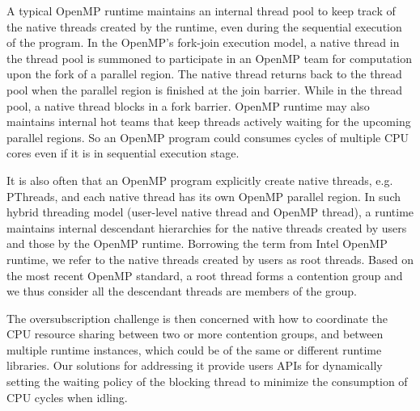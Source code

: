 
A typical OpenMP runtime maintains 
an internal thread pool to keep track of the native threads created by the runtime, 
even during the sequential execution of the program. 
In the OpenMP's fork-join execution model, a native thread in the thread pool 
is summoned to participate in an OpenMP team for computation upon the fork of a {\sf parallel} region. 
The native thread returns back to the thread pool when the {\sf parallel} 
region is finished at the join barrier. While in the 
thread pool, a native thread blocks in a fork barrier. 
OpenMP runtime may also
maintains internal hot teams that keep threads actively waiting for the upcoming {\sf parallel} regions. 
So an OpenMP program could consumes cycles of multiple CPU cores even if it is in sequential execution stage.

It is also often that an OpenMP program explicitly create native threads, e.g. PThreads, and each native thread has
its own OpenMP {\sf parallel} region. 
In such hybrid threading model (user-level native thread and OpenMP thread), 
a runtime maintains internal descendant hierarchies for the native threads created by users and
those by the OpenMP runtime. Borrowing the term from Intel OpenMP runtime, we refer to 
the native threads created by users as root threads. 
Based on the most recent OpenMP standard, a root thread forms a contention group and we thus 
consider all the descendant threads are members of the group. 


The oversubscription challenge is then concerned with how 
to coordinate the CPU resource sharing between two or more contention groups, and between multiple 
runtime instances, which could be of the same or different runtime libraries. 
Our solutions for addressing it provide users APIs for 
dynamically setting the waiting policy of the blocking thread to minimize 
the consumption of CPU cycles when idling. 


